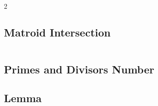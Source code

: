 \documentclass[8pt, a4paper, oneside]{extarticle}
\begin{document}
\begin{multicols*}{2}

\subsection{Matroid Intersection}
\inputminted{c++}{codes/miscellaneous/matroid_intersection.cpp}

\subsection{Primes and Divisors Number}


\subsection{Lemma}



\end{multicols*}
\end{document}
